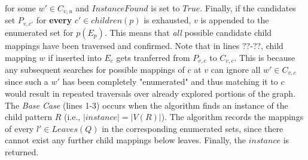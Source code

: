 for some $w' \in C_{v,u}$ and $InstanceFound$ is set to $True$. Finally, if the candidates set $P_{v,c'}$ for \textbf{every} $c'\in children(p)$
is exhausted, $v$ is appended to the enumerated set for $p (E_{p})$. This means that
\textit{all} possible candidate child mappings have been traversed and
confirmed. Note that in lines ??-??, child mapping $w$ if inserted into $E_{c}$
gets tranferred from $P_{v,c}$ to $C_{v,c}$. This is because any subsequent searches for possible mappings of $c$ at $v$
can ignore all $w' \in C_{v,c}$ since such a $w'$ has been completely
"enumerated" and thus matching it to $c$ would result in repeated traversals
over already explored portions of the graph. The \textit{Base Case} (lines 1-3) occurs when the algorithm finds an instance
of the child pattern $R$ (i.e., $|instance|=|V(R)|$). The algorithm
records the mappings of every $l'\in Leaves(Q)$ in the corresponding enumerated
sets, since there cannot exist any further child mappings below leaves. Finally,
the $instance$ is returned.


